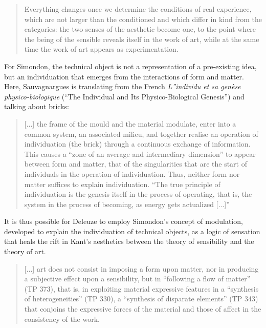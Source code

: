         \begin{quote}
            Everything changes once we determine the conditions of real experience, which are not larger than the conditioned and which differ in kind from the categories: the two senses of the aesthetic become one, to the point where the being of the sensible reveals itself in the work of art, while at the same time the work of art appears as experimentation. \citep[p.68]{DeleuzeDifferenceAndRepetition1994}
        \end{quote}

        For Simondon, the technical object is not a representation of a pre-existing idea, but an individuation that emerges from the interactions of form and matter. Here, Sauvagnargues is translating from the French \emph{L”individu et sa genèse physico-biologique} (“The Individual and Its Physico-Biological Genesis”) and talking about bricks:

        \begin{quote}
            [...] the frame of the mould and the material modulate, enter into a common system, an associated milieu, and together realise an operation of individuation (the brick) through a continuous exchange of information. This causes a “zone of an average and intermediary dimension” to appear between form and matter, that of the singularities that are the start of individuals in the operation of individuation. Thus, neither form nor matter suffices to explain individuation. “The true principle of individuation is the genesis itself in the process of operating, that is, the system in the process of becoming, as energy gets actualized [...]” \citep[p.69]{SauvagnarguesArtmchns2016}
        \end{quote}

        It is thus possible for Deleuze to employ Simondon's concept of modulation, developed to explain the individuation of technical objects, as a logic of sensation that heals the rift in Kant's aesthetics between the theory of sensibility and the theory of art. \citep[p.71]{SauvagnarguesArtmchns2016}

        \begin{quote}
            [...] art does not consist in imposing a form upon matter, nor in producing a subjective effect upon a sensibility, but in “following a flow of matter” (TP 373), that is, in exploiting material expressive features in a “synthesis of heterogeneities” (TP 330), a “synthesis of disparate elements” (TP 343) that conjoins the expressive forces of the material and those of affect in the consistency of the work. \citep[p.71]{SauvagnarguesArtmchns2016}
        \end{quote}

